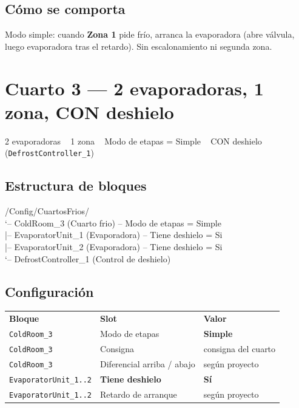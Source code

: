 \documentclass[11pt,a4paper]{article}
\newcommand{\md}{\,\textcolor{gris}{\textbullet}\,}
\newcommand{\code}[1]{\texttt{#1}}
\newcommand{\cabfila}{\color{white}\bfseries}
\begin{document}
\subsection{Cómo se comporta}
\begin{comporta}
Modo simple: cuando \textbf{Zona 1} pide frío, arranca la evaporadora (abre válvula, luego evaporadora
tras el retardo). Sin escalonamiento ni segunda zona.
\end{comporta}

\section{Cuarto 3 — 2 evaporadoras, 1 zona, CON deshielo}
\begin{ficha}{}2 evaporadoras \md\ 1 zona \md\ Modo de etapas = Simple \md\ CON deshielo (\code{DefrostController_1})\end{ficha}

\subsection{Estructura de bloques}
\begin{arbol}
/Config/CuartosFrios/\\
`-- ColdRoom_3              (Cuarto frio)  -- Modo de etapas = Simple\\
\phantom{`-- }|-- EvaporatorUnit_1    (Evaporadora)  -- Tiene deshielo = Si\\
\phantom{`-- }|-- EvaporatorUnit_2    (Evaporadora)  -- Tiene deshielo = Si\\
\phantom{`-- }`-- DefrostController_1 (Control de deshielo)
\end{arbol}

\subsection{Configuración}
\begin{center}\small
{}
\begin{tabular}{L{3.6cm} L{4.6cm} L{5.4cm}}
\cabfila \textbf{Bloque} & \cabfila \textbf{Slot} & \cabfila \textbf{Valor} \\
\code{ColdRoom_3} & Modo de etapas & \textbf{Simple} \\
\code{ColdRoom_3} & Consigna & consigna del cuarto \\
\code{ColdRoom_3} & Diferencial arriba / abajo & según proyecto \\
\code{EvaporatorUnit_1..2} & \textbf{Tiene deshielo} & \textbf{Sí} \\
\code{EvaporatorUnit_1..2} & Retardo de arranque & según proyecto \\
\end{tabular}
\end{center}
\end{document}
